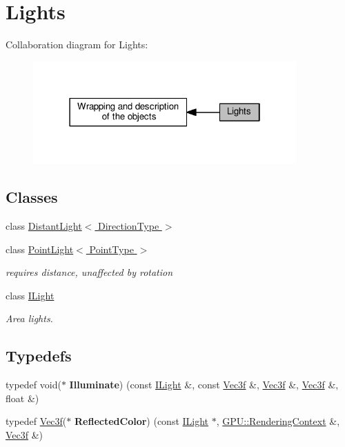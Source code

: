 \hypertarget{group__lights}{}\section{Lights}
\label{group__lights}
Collaboration diagram for Lights\+:\nopagebreak
\begin{figure}[H]
\begin{center}
\leavevmode
\includegraphics[width=286pt]{group__lights}
\end{center}
\end{figure}
\subsection*{Classes}
\begin{DoxyCompactItemize}
\item 
class \hyperlink{class_distant_light}{Distant\+Light$<$ Direction\+Type $>$}
\item 
class \hyperlink{class_point_light}{Point\+Light$<$ Point\+Type $>$}
\begin{DoxyCompactList}\small\item\em requires distance, unaffected by rotation \end{DoxyCompactList}\item 
class \hyperlink{class_i_light}{I\+Light}
\begin{DoxyCompactList}\small\item\em Area lights. \end{DoxyCompactList}\end{DoxyCompactItemize}
\subsection*{Typedefs}
\begin{DoxyCompactItemize}
\item 
typedef void($\ast$ {\bfseries Illuminate}) (const \hyperlink{class_i_light}{I\+Light} \&, const \hyperlink{class_vec3}{Vec3f} \&, \hyperlink{class_vec3}{Vec3f} \&, \hyperlink{class_vec3}{Vec3f} \&, float \&)\hypertarget{group__lights_ga8a5d15252b2bfd290218ef2cd88c51ee}{}\label{group__lights_ga8a5d15252b2bfd290218ef2cd88c51ee}

\item 
typedef \hyperlink{class_vec3}{Vec3f}($\ast$ {\bfseries Reflected\+Color}) (const \hyperlink{class_i_light}{I\+Light} $\ast$, \hyperlink{struct_g_p_u_1_1_rendering_context}{G\+P\+U\+::\+Rendering\+Context} \&, \hyperlink{class_vec3}{Vec3f} \&)\hypertarget{group__lights_ga1445cd39b3bf19d4237cd41d2de2243e}{}\label{group__lights_ga1445cd39b3bf19d4237cd41d2de2243e}

\end{DoxyCompactItemize}

